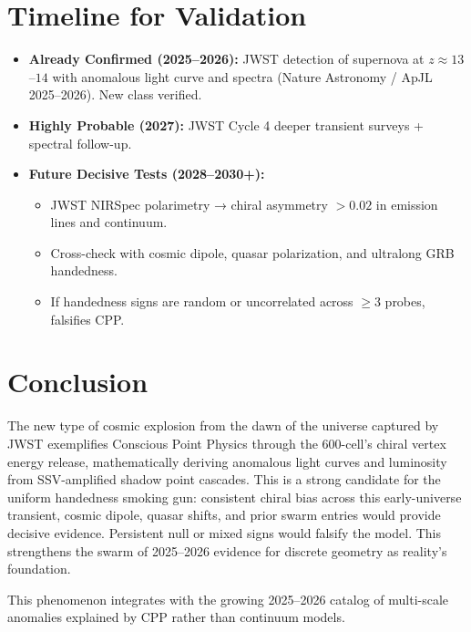 \documentclass[11pt]{article}
\begin{document}
\section{Timeline for Validation}
\begin{itemize}
 \item \textbf{Already Confirmed (2025--2026):} JWST detection of supernova at $z \approx 13$--$14$ with anomalous light curve and spectra (Nature Astronomy / ApJL 2025--2026). New class verified.
    \item \textbf{Highly Probable (2027):} JWST Cycle 4 deeper transient surveys + spectral follow-up.
    \item \textbf{Future Decisive Tests (2028--2030+):}
    \begin{itemize}
        \item JWST NIRSpec polarimetry → chiral asymmetry $>0.02$ in emission lines and continuum.
        \item Cross-check with cosmic dipole, quasar polarization, and ultralong GRB handedness.
        \item If handedness signs are random or uncorrelated across $\geq 3$ probes, falsifies CPP.
    \end{itemize}
\end{itemize}

\section{Conclusion}
The new type of cosmic explosion from the dawn of the universe captured by JWST exemplifies Conscious Point Physics through the 600-cell's chiral vertex energy release, mathematically deriving anomalous light curves and luminosity from SSV-amplified shadow point cascades. This is a strong candidate for the uniform handedness smoking gun: consistent chiral bias across this early-universe transient, cosmic dipole, quasar shifts, and prior swarm entries would provide decisive evidence. Persistent null or mixed signs would falsify the model. This strengthens the swarm of 2025--2026 evidence for discrete geometry as reality's foundation.

This phenomenon integrates with the growing 2025--2026 catalog of multi-scale anomalies explained by CPP rather than continuum models.
\end{document}
